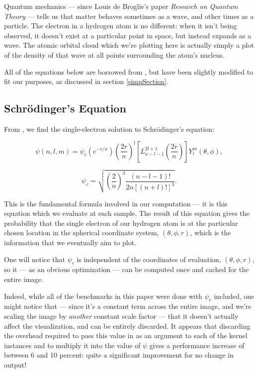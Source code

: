\documentclass{acmsiggraph}
\begin{document}
Quantum mechanics --- since Louis de Broglie's paper {\it Research on Quantum Theory} --- tells us that matter behaves sometimes as a wave, and other times as a particle. The electron in a hydrogen atom is no different: when it isn't being observed, it doesn't exist at a particular point in space, but instead expands as a wave. The atomic orbital cloud which we're plotting here is actually simply a plot of the density of that wave at all points surrounding the atom's nucleus.

All of the equations below are borrowed from \cite{quantumBook}, but have been slightly modified to fit our purposes, as discussed in section \ref{simpSection}.

\subsection{Schr\"{o}dinger's Equation}

From \cite{quantumBook}, we find the single-electron solution to Schr\"{o}dinger's equation:

\begin{equation}\label{psi}
\psi\left(n, l, m\right)=\psi_c
\left(\mathit{e}^{-r/n}\right)
\left(\frac{2r}{n}\right)^l
\left[L_{n-l-1}^{2l+1}
    \left(\frac{2r}{n}\right)\right]
Y_l^m\left(\theta,\phi\right),
\end{equation}

\begin{equation}\label{psiConstant}
\psi_c=\sqrt{\left(\frac{2}{n}\right)^3
    \frac{\left(n-l-1\right)!}{2n\left[\left(n+l\right)!\right]^3}}.
\end{equation}

This is the fundamental formula involved in our computation --- it is this equation which we evaluate at each sample. The result of this equation gives the probability that the single electron of our hydrogen atom is at the particular chosen location in the spherical coordinate system, $\left(\theta, \phi, r\right)$, which is the information that we eventually aim to plot.

One will notice that $\psi_c$ is independent of the coordinates of evaluation, $\left(\theta, \phi, r\right)$, so it --- as an obvious optimization --- can be computed once and cached for the entire image.

Indeed, while all of the benchmarks in this paper were done with $\psi_c$ included, one might notice that --- since it's a constant term across the entire image, and we're scaling the image by {\it another} constant scale factor --- that it doesn't actually affect the visualization, and can be entirely discarded. It appears that discarding the overhead required to pass this value in as an argument to each of the kernel instances and to multiply it into the value of $\psi$ gives a performance increase of between 6 and 10 percent: quite a significant improvement for no change in output!
\end{document}
